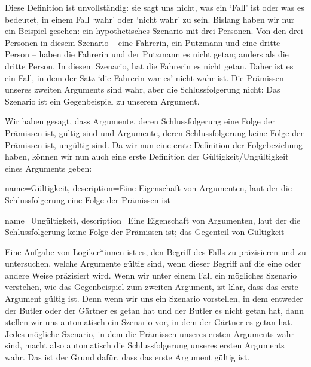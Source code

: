 
Diese Definition ist unvollständig: sie sagt uns nicht, was ein `Fall' ist oder was es bedeutet, in einem Fall `wahr' oder `nicht wahr' zu sein. Bislang haben wir nur ein Beispiel gesehen: ein hypothetisches Szenario mit drei Personen. Von den drei Personen in diesem Szenario -- eine Fahrerin, ein Putzmann und eine dritte Person -- haben die Fahrerin und der Putzmann es nicht getan; anders als die dritte Person. In diesem Szenario, hat die Fahrerin es nicht getan. Daher ist es ein Fall, in dem der Satz `die Fahrerin war es' nicht wahr ist. Die Prämissen unseres zweiten Arguments sind wahr, aber die Schlussfolgerung nicht: Das Szenario ist ein Gegenbeispiel zu unserem Argument.

Wir haben gesagt, dass Argumente, deren Schlussfolgerung eine Folge der Prämissen ist, gültig sind und Argumente, deren Schlussfolgerung keine Folge der Prämissen ist, ungültig sind. Da wir nun eine erste Definition der Folgebeziehung haben, können wir nun auch eine erste Definition der Gültigkeit/Ungültigkeit eines Arguments geben: 



{
name=Gültigkeit,
description={Eine Eigenschaft von Argumenten, laut der die Schlussfolgerung eine Folge der Prämissen ist}
}

{
name=Ungültigkeit,
description={Eine Eigenschaft von Argumenten, laut der die Schlussfolgerung keine Folge der Prämissen ist; das Gegenteil von \gls{Gültigkeit}}
}

Eine Aufgabe von Logiker*innen ist es, den Begriff des Falls zu präzisieren und zu untersuchen, welche Argumente gültig sind, wenn dieser Begriff auf die eine oder andere Weise präzisiert wird. Wenn wir unter einem Fall ein mögliches Szenario verstehen, wie das Gegenbeispiel zum zweiten Argument, ist klar, dass das erste Argument gültig ist. Denn wenn wir uns ein Szenario vorstellen, in dem entweder der Butler oder der Gärtner es getan hat und der Butler es nicht getan hat, dann stellen wir uns automatisch ein Szenario vor, in dem der Gärtner es getan hat. Jedes mögliche Szenario, in dem die Prämissen unseres ersten Arguments wahr sind, macht also automatisch die Schlussfolgerung unseres ersten Arguments wahr. Das ist der Grund dafür, dass das erste Argument gültig ist. 

